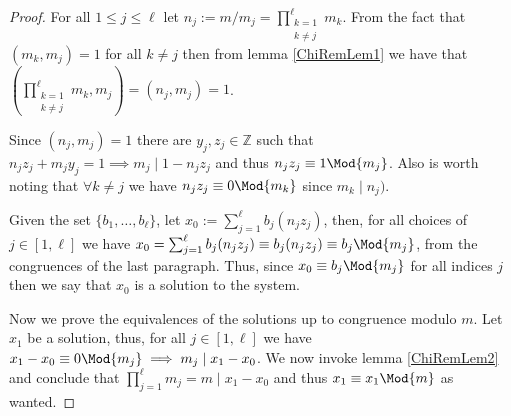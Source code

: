 \begin{proof}
    For all \(1 \leqslant j \leqslant \ell\) let \(n_j := m/m_j =
    \prod_{\substack{k = 1 \\ k \neq j}}^{\ell} m_k\). From the fact that \((m_k,
    m_j) = 1\) for all \(k \neq j\) then from lemma \ref{ChiRemLem1} we have that
    \((\prod_{\substack{k=1 \\ k \neq j}}^\ell m_k, m_j) = (n_j, m_j) = 1\).

    Since \((n_j, m_j) = 1\) there are  \(y_j, z_j \in \mathbb{Z}\) such that
    \(n_jz_j + m_jy_j = 1 \implies m_j \mid 1 - n_j z_j\) and thus \(n_jz_j
    \equiv 1 \Mod{m_j}\). Also is worth noting that \(\forall k \neq j\) we have
    \(n_jz_j \equiv 0 \Mod{m_k}\) since  \(m_k \mid n_j)\).

    Given the set \(\{b_1, \dots, b_\ell\}\), let \(x_0 := \sum_{j=1}^\ell b_j
    (n_j z_j)\), then, for all choices of \(j \in [1, \ell]\) we have \(x_0 =
    \sum_{j=1}^\ell b_j(n_jz_j) \equiv b_j(n_jz_j) \equiv b_j \Mod{m_j}\), from
    the congruences of the last paragraph. Thus, since \(x_0 \equiv b_j
    \Mod{m_j}\) for all indices  \(j\) then we say that  \(x_0\) is a solution to
    the system.

    Now we prove the equivalences of the solutions up to congruence modulo \(m\).
    Let \(x_1\) be a solution, thus, for all  \(j \in [1, \ell]\) we have \(x_1 -
    x_0 \equiv 0 \Mod{m_j} \implies m_j \mid x_1 - x_0\). We now invoke lemma
    \ref{ChiRemLem2} and conclude that \(\prod_{j=1}^{\ell} m_j = m \mid x_1 -
    x_0\) and thus \(x_1 \equiv x_1 \Mod{m}\) as wanted.
\end{proof}

